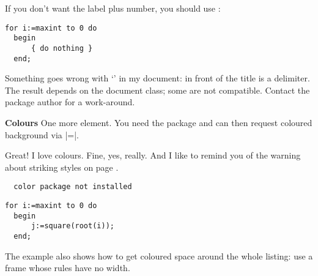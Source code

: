 \begin{paracol}{2}
If you don't want the label \texttt{\lstlistingname} plus number, you should
use :
\begin{lstsample}[title]{\lstset{xleftmargin=.05\linewidth}}{}
  \begin{lstlisting}[title={`Caption' without label}]
  for i:=maxint to 0 do
  begin
      { do nothing }
  end;
  \end{lstlisting}
\end{lstsample}
\begin{advise}
\item Something goes wrong with `' in my document: in front of
     the title is a delimiter.
     \advisespace
     The result depends on the document class; some are not compatible.
     Contact the package author for a work-around.
\end{advise}

\textbf{Colours}
One more element. You need the  package and can then
request coloured background via
|=|.
\begin{advise}
\item Great! I love colours.
     \advisespace
     Fine, yes, really. And I like to remind you of the warning about
     striking styles on page \pageref{wStrikingStyles}.
\end{advise}
\ifcolor
\begin{lstxsample}[backgroundcolor]
\end{lstxsample}
\else
\begin{verbatim}
  color package not installed\end{verbatim}
\fi
\begin{lstsample}{}{}
  \begin{lstlisting}[frame=single,
                     framerule=0pt]
  for i:=maxint to 0 do
  begin
      j:=square(root(i));
  end;
  \end{lstlisting}
\end{lstsample}
The example also shows how to get coloured space around the whole listing:
use a frame whose rules have no width.


\end{paracol}